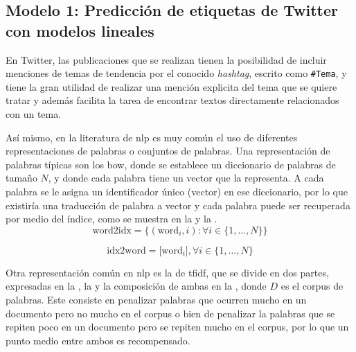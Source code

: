 \subsection{Modelo 1: Predicción de etiquetas de Twitter con modelos lineales} \label{sec:twitter-prediction}
En Twitter, las publicaciones que se realizan tienen la posibilidad de incluir menciones de temas de tendencia por el conocido \emph{hashtag}, escrito como \texttt{\#Tema}, y tiene la gran utilidad de realizar una mención explicita del tema que se quiere tratar y además facilita la tarea de encontrar textos directamente relacionados con un tema.


Así mismo, en la literatura de \gls{nlp} es muy común el uso de diferentes representaciones de palabras o conjuntos de palabras. Una representación de palabras típicas son los \gls{bow}, donde se establece un diccionario de palabras de tamaño $N$, y donde cada palabra tiene un vector que la representa. A cada palabra se le asigna un identificador único (vector) en ese diccionario, por lo que existiría una traducción de palabra a vector y cada palabra puede ser recuperada por medio del índice, como se muestra en la  y la .
\begin{equation} \label{eq:bow-repr1}
  \text{word2idx} = \Big\{(\text{word}_i, i) : \forall i \in \{1, \ldots, N\} \Big\}
\end{equation}

\begin{equation} \label{eq:bow-repr2}
  \text{idx2word} = \Big[\text{word}_i\Big], \forall i \in \{1, \ldots, N\}
\end{equation}

Otra representación común en \gls{nlp} es la de \gls{tfidf}, que se divide en dos partes, expresadas en la , la  y la composición de ambas en la , donde $D$ es el corpus de palabras. Este consiste en penalizar palabras que ocurren mucho en un documento pero no mucho en el corpus o bien de penalizar la palabras que se repiten poco en un documento pero se repiten mucho en el corpus, por lo que un punto medio entre ambos es recompensado.

